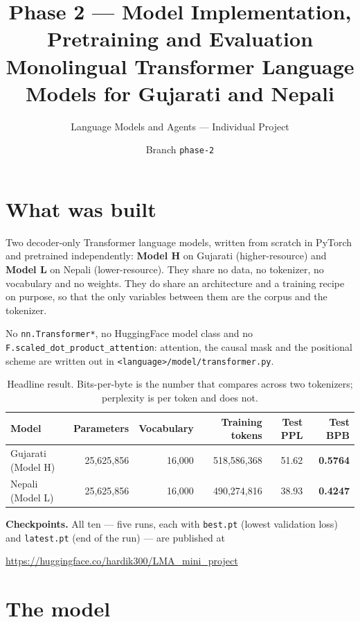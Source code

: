 \documentclass[11pt,a4paper]{article}
\title{\vspace{-1.5cm}\textbf{Phase 2 --- Model Implementation, Pretraining and
Evaluation}\\[0.3em]
\large Monolingual Transformer Language Models for Gujarati and Nepali}
\author{Language Models and Agents --- Individual Project}
\date{Branch \texttt{phase-2}}
\begin{document}
\maketitle

\vspace{-0.8cm}

\section{What was built}


Two decoder-only Transformer language models, written from scratch in PyTorch
and pretrained independently: \textbf{Model H} on Gujarati (higher-resource) and
\textbf{Model L} on Nepali (lower-resource). They share no data, no tokenizer,
no vocabulary and no weights. They do share an architecture and a training
recipe on purpose, so that the only variables between them are the corpus and
the tokenizer.

No \texttt{nn.Transformer*}, no HuggingFace model class and no
\texttt{F.scaled\_dot\_product\_attention}: attention, the causal mask and the
positional scheme are written out in \texttt{<language>/model/transformer.py}.


\begin{table}[H]
\centering
\small
\begin{tabular}{lrrrrr}
\toprule
\textbf{Model} & \textbf{Parameters} & \textbf{Vocabulary} & \textbf{Training tokens} & \textbf{Test PPL} & \textbf{Test BPB} \\
\midrule
Gujarati (Model H) & 25,625,856 & 16,000 & 518,586,368 & 51.62 & \textbf{0.5764} \\
Nepali (Model L) & 25,625,856 & 16,000 & 490,274,816 & 38.93 & \textbf{0.4247} \\
\bottomrule
\end{tabular}
\caption{Headline result. Bits-per-byte is the number that compares across two tokenizers; perplexity is per token and does not.}
\label{tab:summary}
\end{table}



\textbf{Checkpoints.} All ten --- five runs, each with \texttt{best.pt} (lowest
validation loss) and \texttt{latest.pt} (end of the run) --- are published at
\begin{center}
\url{https://huggingface.co/hardik300/LMA\_mini\_project}
\end{center}


\section{The model}
\end{document}
